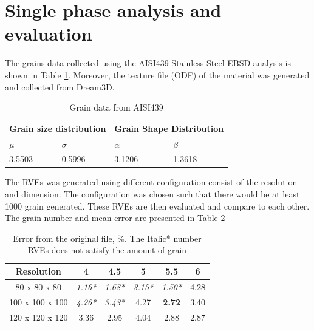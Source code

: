 \section{Single phase analysis and evaluation}
The grains data collected using the AISI439 Stainless Steel EBSD analysis is shown in Table \ref{singlephase}. Moreover, the texture file (ODF) of the material was generated and collected from Dream3D.

\begin{table}[h]

\begin{tabular}{|ll|ll|}
\hline
\multicolumn{2}{|l|}{Grain size distribution}    & \multicolumn{2}{l|}{Grain Shape Distribution}    \\ \hline
\multicolumn{1}{|l|}{$ \mu$ } &  $ \sigma$   & \multicolumn{1}{l|}{$ \alpha $  } & $ \beta$  \\ \hline
\multicolumn{1}{|l|}{ 3.5503} &  0.5996   & \multicolumn{1}{l|}{3.1206} & 1.3618  \\ \hline
\end{tabular}
\centering
\captionsetup{justification=centering,margin=2cm}
\caption{Grain data from AISI439}
\label{singlephase}
\end{table}


The RVEs was generated using different configuration consist of the resolution and dimension. The configuration was chosen such that there would be at least 1000 grain generated. These RVEs are then evaluated and compare to each other. The grain number and mean error are presented in Table \ref{error_table} 

\begin{table}[h]
    \centering
    \captionsetup{justification=centering,margin=2cm}
    \caption{Error from the original file, \%. The Italic* number RVEs does not satisfy the amount of grain}
    \begin{tabular}{| c | c | c | c | c | c | }
         \hline
          Resolution  &  4  &  4.5  &  5  &  5.5 & 6  \\
         \hline
         80 x 80 x 80 & \textit{1.16*}  & \textit{1.68*} & \textit{3.15*} & \textit{1.50*} & 4.28\\
         \hline
         100 x 100 x 100 & \textit{4.26*} & \textit{3.43*}& 4.27 & \textbf{2.72} & 3.40 \\
         \hline
         120 x 120 x 120 & 3.36 & 2.95 & 4.04 & 2.88 & 2.87 \\
         \hline
    \end{tabular}
    \label{error_table}
\end{table}

